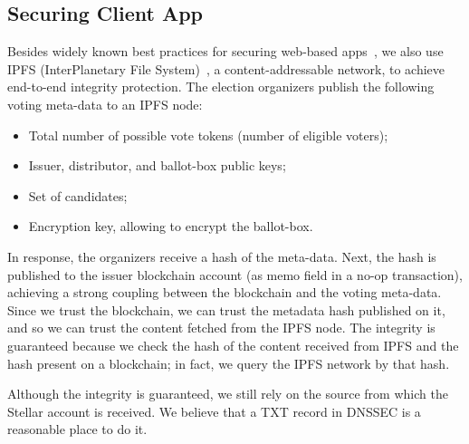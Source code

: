 \documentclass[applsci,article,accept,moreauthors,pdftex]{Definitions/mdpi}
\begin{document}
\subsection{Securing Client App}
Besides widely known best practices for securing web-based apps~\cite{Securing5:online}, we also use IPFS (InterPlanetary File System)~\cite{benet2014ipfs}, a content-addressable network, to achieve end-to-end integrity protection. The election organizers publish the following voting meta-data to an IPFS node:
\begin{itemize}
        \item Total number of possible vote tokens (number of eligible voters);
        \item Issuer, distributor, and ballot-box public keys;
        \item Set of candidates;
        \item Encryption key, allowing to encrypt the ballot-box.
\end{itemize}

In response, the organizers receive a hash of the meta-data. Next, the hash is published to the issuer blockchain account (as memo field in a no-op transaction), achieving a strong coupling between the blockchain and the voting meta-data. Since we trust the blockchain, we can trust the metadata hash published on it, and so we can trust the content fetched from the IPFS node. The integrity is guaranteed because we check the hash of the content received from IPFS and the hash present on a blockchain; in fact, we query the IPFS network by that hash.

Although the integrity is guaranteed, we still rely on the source from which the Stellar account is received. We believe that a TXT record in DNSSEC is a reasonable place to do it.
\end{document}
